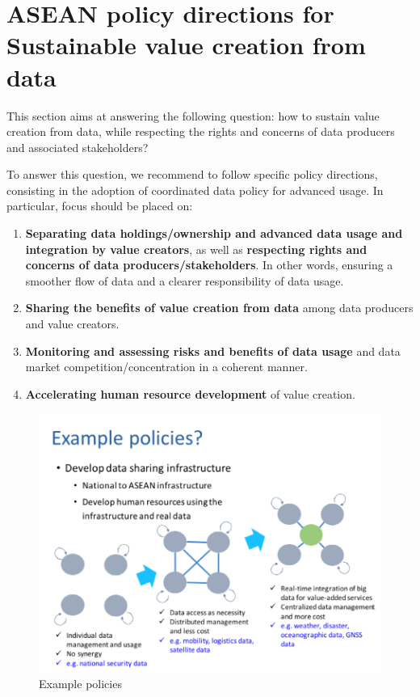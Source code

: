 \section{ASEAN policy directions for Sustainable value creation from data} \label{data_util}

\tab This section aims at answering the following question: how to sustain value creation from data, while respecting the rights and concerns of data producers and associated stakeholders?

\vspace{0.4 cm}

To answer this question, we recommend to follow specific policy directions, consisting in the adoption of coordinated data policy for advanced usage. In particular, focus should be placed on:

\begin{enumerate}

\item \textbf{Separating data holdings/ownership and advanced data usage and integration by value creators}, as well as \textbf{respecting rights and concerns of data producers/stakeholders}. In other words, ensuring a smoother flow of data and a clearer responsibility of data usage.

\item \textbf{Sharing the benefits of value creation from data} among data producers and value creators.

\item \textbf{Monitoring and assessing risks and benefits of data usage} and data market competition/concentration in a coherent manner.

\item \textbf{Accelerating human resource development} of value creation.

\end{enumerate}


\begin{figure}[H]
\begin{center}
\includegraphics[width = 0.8\linewidth]{Figures/example_policies.png}
\end{center}
\caption{Example policies}
\label{example_policies}
\end{figure}



